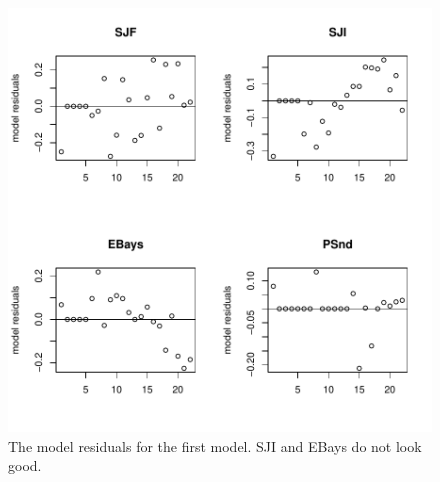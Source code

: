\begin{figure}[htp]
\begin{center}
\includegraphics{./figures/MSS--mss_model_resids_plot}
\end{center}
\caption{The model residuals for the first model.  SJI and EBays do not look good.}
\label{fig:mss.resids.0}
\end{figure}

\clearpage

